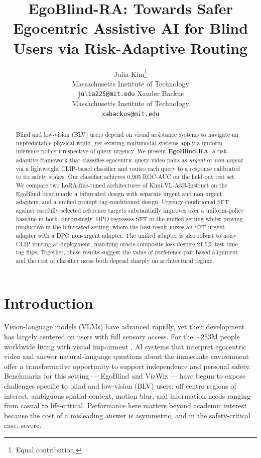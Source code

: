 \documentclass{article}
\title{EgoBlind-RA: Towards Safer Egocentric Assistive AI for Blind Users via Risk-Adaptive Routing}
\author{
  Julia Kim\thanks{Equal contribution.} \\
  Massachusetts Institute of Technology \\
  \texttt{julia225@mit.edu}
  \And
  Xander Backus\footnotemark[1] \\
  Massachusetts Institute of Technology \\
  \texttt{xabackus@mit.edu}
}
\begin{document}
\maketitle
\begin{abstract}
Blind and low-vision (BLV) users depend on visual assistance systems to navigate an unpredictable physical world, yet existing multimodal systems apply a uniform inference policy irrespective of query urgency. We present \textbf{EgoBlind-RA}, a risk-adaptive framework that classifies egocentric query-video pairs as \textit{urgent} or \textit{non-urgent} via a lightweight CLIP-based classifier and routes each query to a response calibrated to its safety stakes. Our classifier achieves 0.905 ROC-AUC on the held-out test set. We compare two LoRA-fine-tuned architectures of Kimi-VL-A3B-Instruct on the EgoBlind benchmark: a bifurcated design with separate urgent and non-urgent adapters, and a unified prompt-tag-conditioned design. Urgency-conditioned SFT against carefully selected reference targets substantially improves over a uniform-policy baseline in both. Surprisingly, DPO regresses SFT in the unified setting whilst proving productive in the bifurcated setting, where the best result mixes an SFT urgent adapter with a DPO non-urgent adapter. The unified adapter is also robust to noisy CLIP routing at deployment, matching oracle composite loss despite 21.5\% test-time tag flips. Together, these results suggest the value of preference-pair-based alignment and the cost of classifier noise both depend sharply on architectural regime.
\end{abstract}

\section{Introduction} Vision-language models (VLMs) have advanced rapidly, yet their development has largely centered on users with full sensory access. For the $\sim$253M people worldwide living with visual impairment \cite{bourne2017magnitude}, AI systems that interpret egocentric video and answer natural-language questions about the immediate environment offer a transformative opportunity to support independence and personal safety. Benchmarks for this setting --- EgoBlind \cite{xiao2025egoblind} and VizWiz \cite{bigham2010vizwiz} --- have begun to expose challenges specific to blind and low-vision (BLV) users: off-centre regions of interest, ambiguous spatial context, motion blur, and information needs ranging from casual to life-critical. Performance here matters beyond academic interest because the cost of a misleading answer is asymmetric, and in the safety-critical case, severe.
\end{document}
